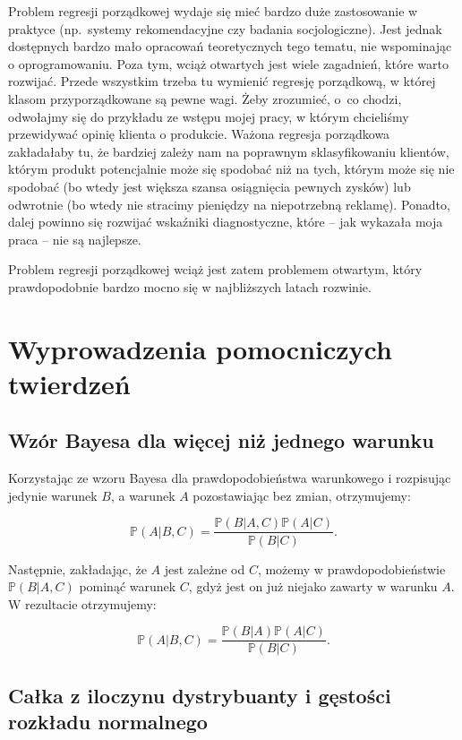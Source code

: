 \documentclass{mini}
\begin{document}
Problem regresji porządkowej wydaje się mieć bardzo duże zastosowanie w praktyce (np.~systemy rekomendacyjne czy badania socjologiczne). Jest jednak dostępnych bardzo mało opracowań teoretycznych tego tematu, nie wspominając o oprogramowaniu. Poza tym, wciąż otwartych jest wiele zagadnień, które warto rozwijać. Przede wszystkim trzeba tu wymienić regresję porządkową, w której klasom przyporządkowane są pewne wagi. Żeby zrozumieć, o~co chodzi, odwołajmy się do przykładu ze wstępu mojej pracy, w którym chcieliśmy przewidywać opinię klienta o produkcie. Ważona regresja porządkowa zakładałaby tu, że bardziej zależy nam na poprawnym sklasyfikowaniu klientów, którym produkt potencjalnie może się spodobać niż na tych, którym może się nie spodobać (bo wtedy jest większa szansa osiągnięcia pewnych zysków) lub odwrotnie (bo wtedy nie stracimy pieniędzy na niepotrzebną reklamę). Ponadto, dalej powinno się rozwijać wskaźniki diagnostyczne, które -- jak wykazała moja praca -- nie są najlepsze. 

Problem regresji porządkowej wciąż jest zatem problemem otwartym, który prawdopodobnie bardzo mocno się w najbliższych latach rozwinie. 

\appendix

\chapter{Wyprowadzenia pomocniczych twierdzeń}

\section{Wzór Bayesa dla więcej niż jednego warunku}\label{app1}

Korzystając ze wzoru Bayesa dla prawdopodobieństwa warunkowego i rozpisując jedynie warunek $B$, a warunek $A$ pozostawiając bez zmian, otrzymujemy:

$$
\mathbb{P}(A | B, C) 
=
\frac{
\mathbb{P}(B | A, C)
\mathbb{P}(A | C)
}{
\mathbb{P}(B | C)
}. 
$$

Następnie, zakładając, że $A$ jest zależne od $C$, możemy w prawdopodobieństwie $\mathbb{P}(B | A, C)$ pominąć warunek $C$, gdyż jest on już niejako zawarty w warunku $A$. W rezultacie otrzymujemy:

$$
\mathbb{P}(A | B, C) 
=
\frac{
\mathbb{P}(B | A)
\mathbb{P}(A | C)
}{
\mathbb{P}(B | C)
}. 
$$

\section{Całka z iloczynu dystrybuanty i gęstości rozkładu normalnego}\label{app2}
\end{document}
